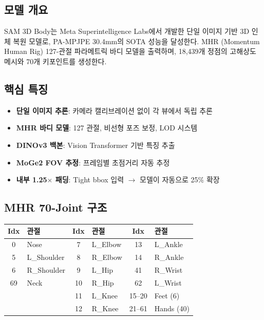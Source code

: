 \documentclass[11pt, a4paper]{article}
\begin{document}
\subsection{모델 개요}

SAM 3D Body는 Meta Superintelligence Labs에서 개발한 단일 이미지 기반 3D 인체 복원 모델로, PA-MPJPE 30.4mm의 SOTA 성능을 달성한다. MHR (Momentum Human Rig) 127-관절 파라메트릭 바디 모델을 출력하며, 18,439개 정점의 고해상도 메시와 70개 키포인트를 생성한다.

\subsection{핵심 특징}
\begin{itemize}
    \item \textbf{단일 이미지 추론}: 카메라 캘리브레이션 없이 각 뷰에서 독립 추론
    \item \textbf{MHR 바디 모델}: 127 관절, 비선형 포즈 보정, LOD 시스템
    \item \textbf{DINOv3 백본}: Vision Transformer 기반 특징 추출
    \item \textbf{MoGe2 FOV 추정}: 프레임별 초점거리 자동 추정
    \item \textbf{내부 1.25$\times$ 패딩}: Tight bbox 입력 $\to$ 모델이 자동으로 25\% 확장
\end{itemize}

\subsection{MHR 70-Joint 구조}

\begin{center}
\begin{tabular}{c l | c l | c l}
\toprule
\textbf{Idx} & \textbf{관절} & \textbf{Idx} & \textbf{관절} & \textbf{Idx} & \textbf{관절} \\
\midrule
0 & Nose & 7 & L\_Elbow & 13 & L\_Ankle \\
5 & L\_Shoulder & 8 & R\_Elbow & 14 & R\_Ankle \\
6 & R\_Shoulder & 9 & L\_Hip & 41 & R\_Wrist \\
69 & Neck & 10 & R\_Hip & 62 & L\_Wrist \\
 & & 11 & L\_Knee & 15--20 & Feet (6) \\
 & & 12 & R\_Knee & 21--61 & Hands (40) \\
\bottomrule
\end{tabular}
\end{center}
\end{document}
